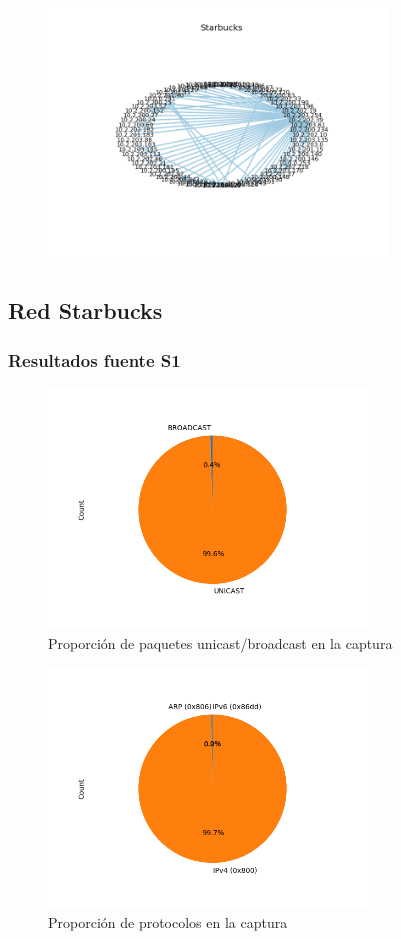 \begin{figure}[H]
 \centering
	\includegraphics[width=0.8\textwidth]{figs/dc.png}
	\caption{}
	\label{fig:dc-grafo}
\end{figure}


\subsection*{Red Starbucks}
\subsubsection*{Resultados fuente S1}
\begin{figure}[H]
  \centering
  \includegraphics[width=8.5cm]{figs/broadcast_proportion_starbucks_S1_output.png}
  \caption{\normalfont Proporción de paquetes unicast/broadcast en la captura}
\end{figure}

\begin{figure}[H]
  \centering
  \includegraphics[width=8.5cm]{figs/protocols_proportion_starbucks_S1_output.png}
  \caption{\normalfont Proporción de protocolos en la captura}
\end{figure}

